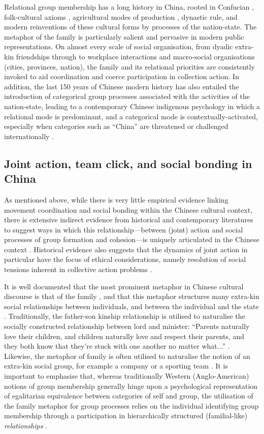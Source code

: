 {  Relational group membership has a long history in China, rooted in Confucian \citep{Hwang1999}, folk-cultural axioms \citep{Wang2009}, agricultural modes of production \citep{Talhelm2014,Fei1992}, dynastic rule, and modern reinventions of these cultural forms by processes of the nation-state\citep{Liu2014}. The metaphor of the family is particularly salient and pervasive in modern public representations.  On almost every scale of social organisation, from dyadic extra-kin friendships through to workplace interactions and macro-social organisations (cities, provinces, nation), the family and its relational priorities are consistently invoked to aid coordination and coerce participation in collection action.
  In addition, the last 150 years of Chinese modern history has also entailed the introduction of categorical group processes associated with the activities of the nation-state, leading to a contemporary Chinese indigenous psychology in which a relational mode is predominant, and a categorical mode is contextually-activated, especially when categories such as ``China'' are threatened or challenged internationally \citep{Liu2009}.


  \subsection{Joint action, team click, and social bonding in China}
  As mentioned above, while there is very little empirical evidence linking movement coordination and social bonding within the Chinese cultural context, there is extensive indirect evidence from historical and contemporary literatures to suggest ways in which this relationship---between (joint) action and social processes of group formation and cohesion---is uniquely articulated in the Chinese context \citep{Weed2011}.  Historical evidence also suggests that the dynamics of joint action in particular have the focus of ethical considerations, namely resolution of social tensions inherent in collective action problems \citep{Slingerland2014}.

  It is well documented that the most prominent metaphor in Chinese cultural discourse is that of the family \citep{Maehr1980}, and that this metaphor structures many extra-kin social relationships between individuals, and between the individual and the state \citep{Gold2002}.  Traditionally, the father-son kinship relationship is utilised to naturalise the socially constructed relationship between lord and minister: ``Parents naturally love their children, and children naturally love and respect their parents, and they both know that they're stuck with one another no matter what...'' \citep[178]{Slingerland2014}. Likewise, the metaphor of family is often utilised to naturalise the notion of an extra-kin social group, for example a company or a sporting team \citep{Brownell2008}.
  It is important to emphasise that, whereas traditionally Western (Anglo-American) notions of group membership generally hinge upon a psychological representation of egalitarian equivalence between categories of self and group, the utilisation of the family metaphor for group processes relies on the individual identifying group membership through a participation in hierarchically structured (familial-like) \textit{relationships} \citep{Fei1992}.

}

